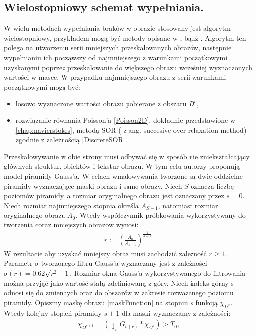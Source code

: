 \documentclass[a4paper,12pt,twoside,openany]{report}
\begin{document}
\subsection{Wielostopniowy schemat wypełniania.}
W wielu metodach wypełniania braków w obrazie stosowany jest algorytm wielostopniowy, przykładem mogą być metody opisane w \cite{kawai2009image}, \cite{komodakis2007image} bądź \cite{wexler2007space}. Algorytm ten polega na utworzeniu serii mniejszych przeskalowanych obrazów, następnie wypełnianiu ich począwszy od najmniejszego z warunkami początkowymi uzyskanymi poprzez przeskalowanie do większego obrazu wcześniej wyznaczonych wartości w masce. W przypadku najmniejszego obrazu z serii warunkami początkowymi mogą być:
\begin{itemize}
\item
losowo wyznaczone wartości obrazu pobierane z obszaru $D^c$,
\item
rozwiązanie równania Poisson'a \eqref{Poisson2D}, dokładnie przedstawione w \autoref{chap:navierstokes}, metodą SOR ( z ang. succesive over relaxation method) zgodnie z zależnością \eqref{DiscreteSOR}.
\end{itemize}
Przeskalowywanie w obie strony musi odbywać się w sposób nie zniekształcający głównych struktur, obiektów i tekstur obrazu. W tym celu autorzy \cite{arias2011variational} proponują model piramidy Gauss'a. W celach wmalowywania tworzone są dwie oddzielne piramidy wyznaczające maski obrazu i same obrazy. Niech $S$ oznacza liczbę poziomów piramidy, a rozmiar oryginalnego obrazu jest oznaczany przez $s=0$. Niech rozmiar najmniejszego stopnia określa $A_{S-1}$, natomiast rozmiar oryginalnego obrazu $A_{0}$. Wtedy współczynnik próbkowania wykorzystywany do tworzenia coraz mniejszych obrazów wynosi:
\begin{align}
r := \left(\frac{A_0}{A_{s-1}}\right)^\frac{1}{s-1}.
\end{align}
W rezultacie aby uzyskać mniejszy obraz musi zachodzić zależność $r \geq 1$. Parametr $\sigma$ tworzonego filtru Gauss'a wyznaczany jest z zależności $\sigma(r)=0.62\sqrt{r^2-1}$. Rozmiar okna Gauss'a wykorzystywanego do filtrowania można przyjąć jako wartość stałą zdefiniowaną z góry. Niech indeks górny s odnosi się do zmiennych oraz do obszarów w zakresie rozważanego poziomu piramidy. Opiszmy maskę obrazu \eqref{maskFunction} na stopniu $s$ funkcją $\chi_{\Omega^{s}}$. Wtedy kolejny stopień piramidy $s+1$ dla maski  wyznaczamy z zależności:
\begin{align}
\chi_{\Omega^{s+1}}=(\downarrow_r G_{\sigma(r)} \ast \chi_{\Omega^s}) > T_{0},
\end{align}
\end{document}
